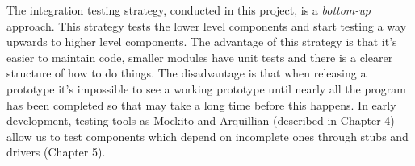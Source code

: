 The integration testing strategy, conducted in this project, is a \textit{bottom-up} approach. This strategy tests the lower level components and start testing a way upwards to higher level components. The advantage of this strategy is that it's easier to maintain code, smaller modules have unit tests and there is a clearer structure of how to do things. The disadvantage is that when releasing a prototype it's impossible to see a working prototype until nearly all the program has been completed so that may take a long time before this happens. In early development, testing tools as Mockito and Arquillian (described in Chapter 4) allow us to test components which depend on incomplete ones through stubs and drivers (Chapter 5).
